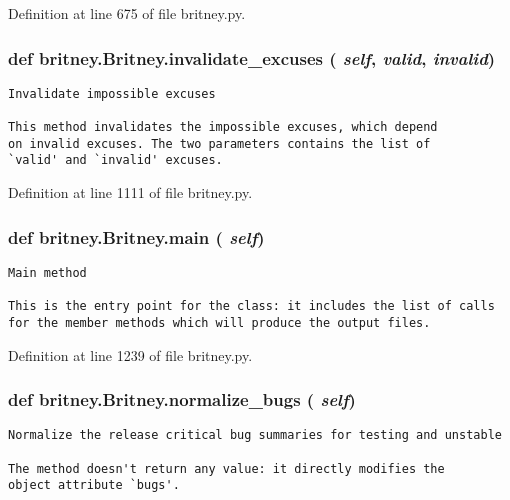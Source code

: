 Definition at line 675 of file britney.py.
\subsubsection{\setlength{\rightskip}{0pt plus 5cm}def britney.Britney.invalidate\_\-excuses ( {\em self},  {\em valid},  {\em invalid})}\label{classbritney_1_1Britney_171969785db449d7a06c3f762774e0cd}




\footnotesize\begin{verbatim}Invalidate impossible excuses

This method invalidates the impossible excuses, which depend
on invalid excuses. The two parameters contains the list of
`valid' and `invalid' excuses.
\end{verbatim}
\normalsize
 

Definition at line 1111 of file britney.py.
\subsubsection{\setlength{\rightskip}{0pt plus 5cm}def britney.Britney.main ( {\em self})}\label{classbritney_1_1Britney_0e9551bdf927388f55be5ce15a48c94f}




\footnotesize\begin{verbatim}Main method

This is the entry point for the class: it includes the list of calls
for the member methods which will produce the output files.
\end{verbatim}
\normalsize
 

Definition at line 1239 of file britney.py.
\subsubsection{\setlength{\rightskip}{0pt plus 5cm}def britney.Britney.normalize\_\-bugs ( {\em self})}\label{classbritney_1_1Britney_5a6af4a100cfd54e872a27fa7f48ac3c}




\footnotesize\begin{verbatim}Normalize the release critical bug summaries for testing and unstable

The method doesn't return any value: it directly modifies the
object attribute `bugs'.
\end{verbatim}
\normalsize
 

